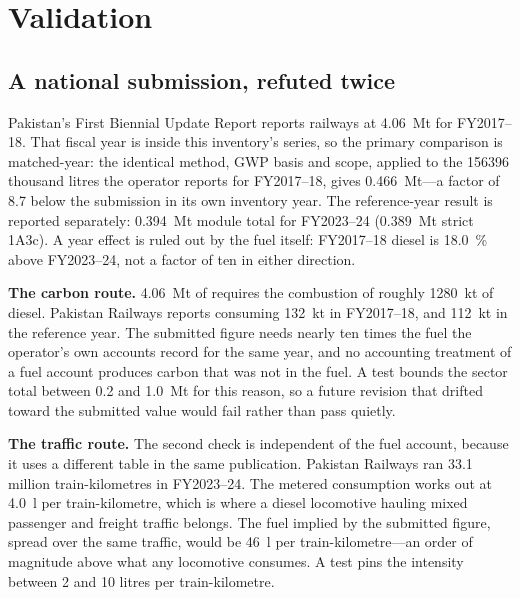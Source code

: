 \section{Validation}
\label{sec:validation}

\subsection{A national submission, refuted twice}

Pakistan's First Biennial Update Report reports railways at \SI{4.06}{\mega\tonne} \COe{} for
FY2017--18. That fiscal year is inside this inventory's series, so the primary comparison is
matched-year: the identical method, GWP basis and scope, applied to the \num{156396} thousand
litres the operator reports for FY2017--18, gives \SI{0.466}{\mega\tonne}---a factor of
\num{8.7} below the submission in its own inventory year. The reference-year result is
reported separately: \SI{0.394}{\mega\tonne} module total for FY2023--24
(\SI{0.389}{\mega\tonne} strict 1A3c). A year effect is ruled out by
the fuel itself: FY2017--18 diesel is \SI{18.0}{\percent} above FY2023--24, not a factor of ten
in either direction.

\textbf{The carbon route.} \SI{4.06}{\mega\tonne} of \COtwo{} requires the combustion of
roughly \SI{1280}{\kilo\tonne} of diesel. Pakistan Railways reports consuming
\SI{132}{\kilo\tonne} in FY2017--18, and \SI{112}{\kilo\tonne} in the reference year. The
submitted figure needs nearly ten times the fuel the operator's own accounts record for the
same year, and no accounting treatment of a fuel account produces carbon that was not in the
fuel. A test bounds the sector total between \SI{0.2}{} and \SI{1.0}{\mega\tonne} for this
reason, so a future revision that drifted toward the submitted value would fail rather than
pass quietly.

\textbf{The traffic route.} The second check is independent of the fuel account, because it
uses a different table in the same publication. Pakistan Railways ran \num{33.1} million
train-kilometres in FY2023--24. The metered consumption works out at
\SI{4.0}{\litre} per train-kilometre, which is where a diesel locomotive hauling mixed
passenger and freight traffic belongs. The fuel implied by the submitted figure, spread over
the same traffic, would be \SI{46}{\litre} per train-kilometre---an order of magnitude above
what any locomotive consumes. A test pins the intensity between \num{2} and \num{10} litres
per train-kilometre.

